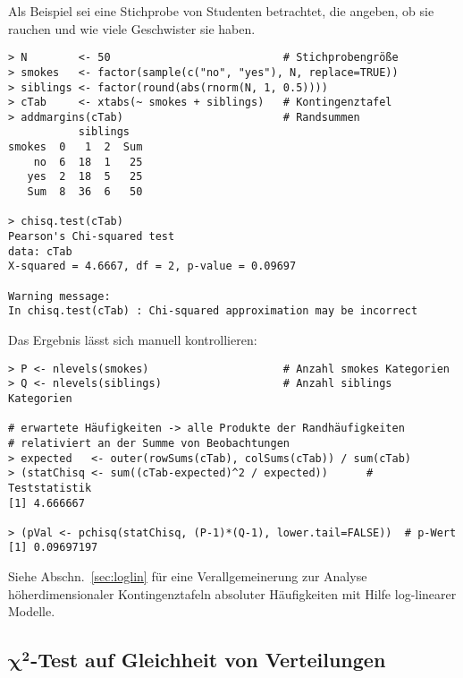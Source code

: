 Als Beispiel sei eine Stichprobe von Studenten betrachtet, die angeben, ob sie rauchen und wie viele Geschwister sie haben.
\begin{lstlisting}
> N        <- 50                           # Stichprobengröße
> smokes   <- factor(sample(c("no", "yes"), N, replace=TRUE))
> siblings <- factor(round(abs(rnorm(N, 1, 0.5))))
> cTab     <- xtabs(~ smokes + siblings)   # Kontingenztafel
> addmargins(cTab)                         # Randsummen
           siblings
smokes  0   1  2  Sum
    no  6  18  1   25
   yes  2  18  5   25
   Sum  8  36  6   50

> chisq.test(cTab)
Pearson's Chi-squared test
data: cTab
X-squared = 4.6667, df = 2, p-value = 0.09697

Warning message:
In chisq.test(cTab) : Chi-squared approximation may be incorrect
\end{lstlisting}

Das Ergebnis lässt sich manuell kontrollieren:
\begin{lstlisting}
> P <- nlevels(smokes)                     # Anzahl smokes Kategorien
> Q <- nlevels(siblings)                   # Anzahl siblings Kategorien

# erwartete Häufigkeiten -> alle Produkte der Randhäufigkeiten
# relativiert an der Summe von Beobachtungen
> expected   <- outer(rowSums(cTab), colSums(cTab)) / sum(cTab)
> (statChisq <- sum((cTab-expected)^2 / expected))      # Teststatistik
[1] 4.666667

> (pVal <- pchisq(statChisq, (P-1)*(Q-1), lower.tail=FALSE))  # p-Wert
[1] 0.09697197
\end{lstlisting}

Siehe Abschn.\ \ref{sec:loglin} für eine Verallgemeinerung zur Analyse höherdimensionaler Kontingenztafeln absoluter Häufigkeiten mit Hilfe log-linearer Modelle.

\subsection[\texorpdfstring{$\chi^{2}$}{chi2}-Test auf Gleichheit von Verteilungen]{$\bm{\chi^{2}}$-Test auf Gleichheit von Verteilungen}
\label{sec:chisqEq}

